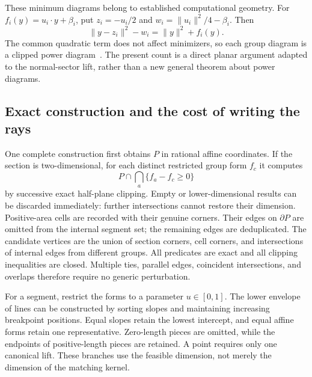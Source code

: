 These minimum diagrams belong to established computational geometry.
For \(f_i(y)=u_i\cdot y+\beta_i\), put
\(z_i=-u_i/2\) and \(w_i=\|u_i\|^2/4-\beta_i\).  Then
\[
 \|y-z_i\|^2-w_i=\|y\|^2+f_i(y).
\]
The common quadratic term does not affect minimizers, so each group
diagram is a clipped power diagram~\cite{Aurenhammer1987}.
The present count is a direct planar argument adapted to the
normal-sector lift, rather than a new general theorem about
power diagrams.

\subsection{Exact construction and the cost of writing the rays}
\label{pl:construction}

One complete construction first obtains \(P\) in rational affine
coordinates.  If the section is two-dimensional, for each distinct
restricted group form \(f_c\) it computes
\[
 P\cap\bigcap_a\{f_a-f_c\geq0\}
\]
by successive exact half-plane clipping.
Empty or lower-dimensional results can be discarded immediately:
further intersections cannot restore their dimension.
Positive-area cells are recorded with their genuine corners.
Their edges on \(\partial P\) are omitted from the internal
segment set; the remaining edges are deduplicated.
The candidate vertices are the union of section corners, cell
corners, and intersections of internal edges from different groups.
All predicates are exact and all clipping inequalities are closed.
Multiple ties, parallel edges, coincident intersections, and
overlaps therefore require no generic perturbation.

For a segment, restrict the forms to a parameter \(u\in[0,1]\).
The lower envelope of lines can be constructed by sorting slopes
and maintaining increasing breakpoint positions.  Equal slopes
retain the lowest intercept, and equal affine forms retain one
representative.  Zero-length pieces are omitted, while the endpoints
of positive-length pieces are retained.  A point requires only one
canonical lift.  These branches use the feasible dimension, not
merely the dimension of the matching kernel.


